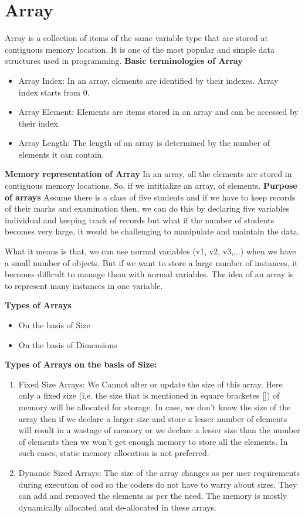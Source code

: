 \section{Array}
Array is a collection of items of the same variable type that are stored
at contiguous memory location. It is one of the most popular and simple
data structures used in programming.
\textbf{Basic terminologies of Array}
\begin{itemize}
\item Array Index: In an array, elements are identified by their
indexes. Array index starts from 0.
\item Array Element: Elements are items stored in an array and can be
accessed by their index.
\item Array Length: The length of an array is determined by the number
of elements it can contain.
\end{itemize}
\textbf{Memory representation of Array}
In an array, all the elements are stored in contiguous memory locations.
So, if we intitialize an array, of elements.
\textbf{Purpose of arrays}
Assume there is a class of five students and if we have to keep records
of their marks and examination then, we can do this by declaring five
variables individual and keeping track of records but what if the number
of students becomes very large, it would be challenging to manipulate
and maintain the data.

What it means is that, we can use normal variables (v1, v2, v3,...)
when we have a small number of objects. But if we want to store a large
number of instances, it becomes difficult to manage them with normal
variables. The idea of an array is to represent many instances in one
variable.

\textbf{Types of Arrays}
\begin{itemize}
    \item On the basis of Size
    \item On the basis of Dimensions
\end{itemize}

\textbf{Types of Arrays on the basis of Size:}
\begin{enumerate}
    \item Fixed Size Arrays:
        We Cannot alter or update the size of this array. Here only a
        fixed size (i,e. the size that is mentioned in square bracketes
        []) of memory will be allocated for storage. In case, we don't
        know the size of the array then if we declare a larger size and
        store a lesser number of elements will result in a wastage of
        memory or we declare a lesser size than the number of elements
        then we won't get enough memory to store all the elements. In
        such cases, static memory allocation is not preferred.
    \item Dynamic Sized Arrays:
        The size of the array changes as per user requirements during
        execution of cod so the coders do not have to warry about sizes.
        They can add and removed the elements as per the need. The
        memory is mostly dynamically allocated and de-allocated in these
        arrays.
\end{enumerate}

